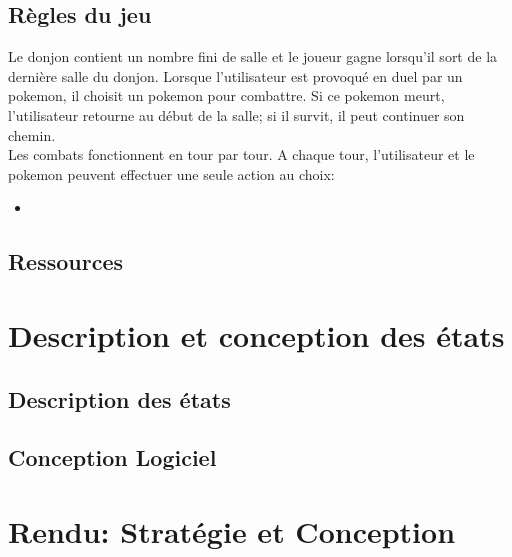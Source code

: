 \documentclass[a4paper,12pt]{article}
\begin{document}
    \subsection{Règles du jeu}
    Le donjon contient un nombre fini de salle et le joueur gagne lorsqu'il sort de la dernière salle du donjon.
    Lorsque l'utilisateur est provoqué en duel par un pokemon, il choisit un pokemon pour combattre. Si ce pokemon meurt, l'utilisateur retourne au début de la salle; si il survit, il peut continuer son chemin.
    \\Les combats fonctionnent en tour par tour. A chaque tour, l'utilisateur et le pokemon peuvent effectuer une seule action au choix: \begin{itemize}
                                                                                                                                             \item
    \end{itemize}


    \subsection{Ressources}



    \clearpage
    \section{Description et conception des états}

    \subsection{Description des états}


    \subsection{Conception Logiciel}



    \clearpage
    \section{Rendu: Stratégie et Conception}
\end{document}
